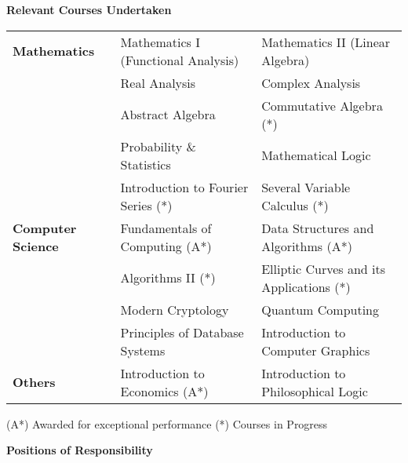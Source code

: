\documentclass[letterpaper,11pt]{article}
\begin{document}
{\begin{itemize}
\end{itemize}

\Large{\textbf{Relevant Courses Undertaken}}
\small

\begin{tabular}{p{4cm} p{7cm} p{7cm}}
\\
\textbf{ Mathematics} & Mathematics I (Functional Analysis) & Mathematics II (Linear Algebra) \vspace{4pt}\\
& Real Analysis & Complex Analysis\vspace{4pt}\\
& Abstract Algebra & Commutative Algebra (*)\vspace{4pt}\\
& Probability \& Statistics & Mathematical Logic\vspace{4pt}\\
& Introduction to Fourier Series (*) & Several Variable Calculus (*)\vspace{9pt}\\

\textbf{ Computer Science} & Fundamentals of Computing (A*) & Data Structures and Algorithms (A*)\vspace{4pt}\\
& Algorithms II (*) & Elliptic Curves and its Applications (*)\vspace{4pt}\\
& Modern Cryptology & Quantum Computing\vspace{4pt}\\
& Principles of Database Systems & Introduction to Computer Graphics\vspace{9pt}\\

\textbf{ Others} & Introduction to Economics (A*) & Introduction to Philosophical Logic\vspace{9pt}\\
\end{tabular}

\footnotesize{\hspace*{0.5in}(A*) Awarded for exceptional performance
\hspace{1.5in}  (*) Courses in Progress\\

\vspace{10pt}

\Large{\textbf{Positions of Responsibility}}
\small

}}
\end{document}
